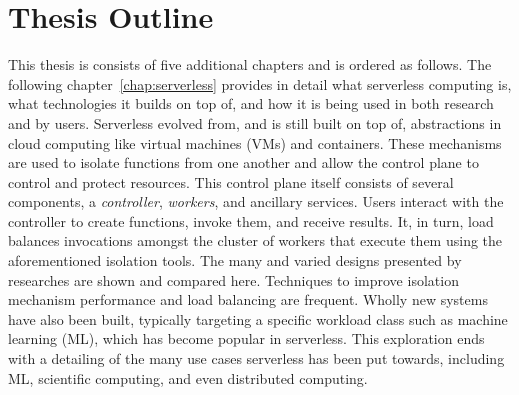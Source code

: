 



\section{Thesis Outline}

This thesis is consists of five additional chapters and is ordered as follows.
The following chapter~\ref{chap:serverless} provides in detail what serverless computing is, what technologies it builds on top of, and how it is being used in both research and by users.
Serverless evolved from, and is still built on top of, abstractions in cloud computing like virtual machines (VMs) and containers.
These mechanisms are used to isolate functions from one another and allow the control plane to control and protect resources.
This control plane itself consists of several components, a \emph{controller}, \emph{workers}, and ancillary services.
Users interact with the controller to create functions, invoke them, and receive results.
It, in turn, load balances invocations amongst the cluster of workers that execute them using the aforementioned isolation tools.
The many and varied designs presented by researches are shown and compared here.
Techniques to improve isolation mechanism performance and load balancing are frequent.
Wholly new systems have also been built, typically targeting a specific workload class such as machine learning (ML), which has become popular in serverless.
This exploration ends with a detailing of the many use cases serverless has been put towards, including ML, scientific computing, and even distributed computing.

